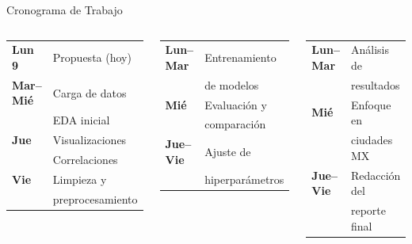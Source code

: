 \documentclass[aspectratio=169]{beamer}
\begin{document}
\begin{frame}{Cronograma de Trabajo}
\vspace{-0.1cm}
\begin{columns}[T]
\begin{tcolorbox}[colback=uaemcolor!5, colframe=uaemcolor!60, title={\footnotesize\textbf{Semana 1 — Exploración}}]
\footnotesize
\begin{tabular}{ll}
\textbf{Lun 9}    & Propuesta (hoy) \\[2pt]
\textbf{Mar--Mié} & Carga de datos \\
                  & EDA inicial \\[2pt]
\textbf{Jue}      & Visualizaciones \\
                  & Correlaciones \\[2pt]
\textbf{Vie}      & Limpieza y \\
                  & preprocesamiento \\
\end{tabular}
\end{tcolorbox}

\begin{tcolorbox}[colback=verdeenv!5, colframe=verdeenv!60, title={\footnotesize\textbf{Semana 2 — Modelado}}]
\footnotesize
\begin{tabular}{ll}
\textbf{Lun--Mar} & Entrenamiento \\
                  & de modelos \\[2pt]
\textbf{Mié}      & Evaluación y \\
                  & comparación \\[2pt]
\textbf{Jue--Vie} & Ajuste de \\
                  & hiperparámetros \\
\end{tabular}
\end{tcolorbox}

\begin{tcolorbox}[colback=naranjaaqi!5, colframe=naranjaaqi!60, title={\footnotesize\textbf{Semana 3 — Análisis}}]
\footnotesize
\begin{tabular}{ll}
\textbf{Lun--Mar} & Análisis de \\
                  & resultados \\[2pt]
\textbf{Mié}      & Enfoque en \\
                  & ciudades MX \\[2pt]
\textbf{Jue--Vie} & Redacción del \\
                  & reporte final \\
\end{tabular}
\end{tcolorbox}
\end{columns}


\end{frame}
\end{document}
